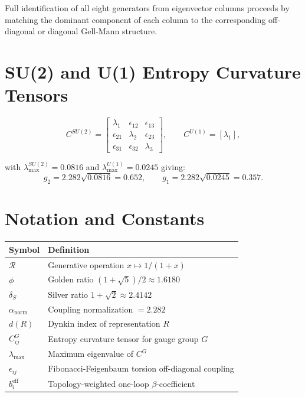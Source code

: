 \documentclass[11pt]{article}
\begin{document}
Full identification of all eight generators from eigenvector
columns proceeds by matching the dominant component of each
column to the corresponding off-diagonal or diagonal
Gell-Mann structure.

\section{SU(2) and U(1) Entropy Curvature Tensors}
\label{app:su2u1}

\begin{equation}
  C^{SU(2)} =
  \begin{bmatrix}
  \lambda_1 & \epsilon_{12} & \epsilon_{13} \\
  \epsilon_{21} & \lambda_2 & \epsilon_{23} \\
  \epsilon_{31} & \epsilon_{32} & \lambda_3
  \end{bmatrix},
  \qquad
  C^{U(1)} = [\lambda_1],
\end{equation}

with $\lambda_\text{max}^{SU(2)}=0.0816$ and
$\lambda_\text{max}^{U(1)}=0.0245$ giving:
\begin{equation}
  g_2 = 2.282\sqrt{0.0816} = 0.652,
  \qquad
  g_1 = 2.282\sqrt{0.0245} = 0.357.
\end{equation}

\section{Notation and Constants}
\label{app:notation}

\begin{tabular}{@{}ll@{}}
\toprule
Symbol & Definition \\
\midrule
$\mathcal{R}$        & Generative operation $x\mapsto 1/(1+x)$ \\
$\phi$               & Golden ratio $(1+\sqrt{5})/2 \approx 1.6180$ \\
$\delta_S$           & Silver ratio $1+\sqrt{2} \approx 2.4142$ \\
$\alpha_\text{norm}$ & Coupling normalization $= 2.282$ \\
$d(R)$               & Dynkin index of representation $R$ \\
$C^{G}_{ij}$         & Entropy curvature tensor for gauge group $G$ \\
$\lambda_\text{max}$ & Maximum eigenvalue of $C^G$ \\
$\epsilon_{ij}$      & Fibonacci-Feigenbaum torsion off-diagonal coupling \\
$b_i^\text{eff}$     & Topology-weighted one-loop $\beta$-coefficient \\
\bottomrule
\end{tabular}
\end{document}

